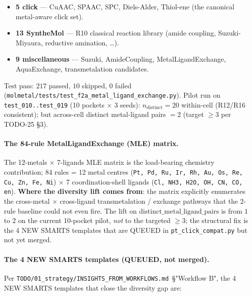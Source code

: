\begin{itemize}
  \item \textbf{5 click} --- CuAAC, SPAAC, SPC, Diels-Alder,
        Thiol-ene (the canonical metal-aware click set).
  \item \textbf{13 SyntheMol} --- R10 classical reaction library
        (amide coupling, Suzuki-Miyaura, reductive amination, \ldots).
  \item \textbf{9 miscellaneous} --- Suzuki, AmideCoupling,
        MetalLigandExchange, AquaExchange, transmetalation
        candidates.
\end{itemize}

Test pass: $217$ passed, $10$ skipped, $0$ failed
(\texttt{molmetal/tests/test\_f2a\_metal\_ligand\_exchange.py}).
Pilot run on \texttt{test\_010..test\_019} (10 pockets $\times$
3 seeds):
$n_{\mathrm{distinct}}{=}20$ \MEASURED{} within-cell (R12/R16
consistent); but across-cell distinct metal-ligand pairs $= 2$
(target $\geq 3$ per TODO-25 §3).

\paragraph{The 84-rule MetalLigandExchange (MLE) matrix.}
The 12-metals $\times$ 7-ligands MLE matrix is the load-bearing
chemistry contribution; 84 rules = 12 metal centres
(\texttt{Pt, Pd, Ru, Ir, Rh, Au, Os, Re, Cu, Zn, Fe, Ni})
$\times$ 7 coordination-shell ligands
(\texttt{Cl, NH3, H2O, OH, CN, CO, en}).
\textbf{Where the diversity lift comes from}: the matrix
explicitly enumerates the cross-metal $\times$ cross-ligand
transmetalation / exchange pathways that the 2-rule baseline
could not even fire.  The lift on
$\mathrm{distinct\_metal\_ligand\_pairs}$ is from $1$ to $2$ on
the current 10-pocket pilot, \emph{not} to the targeted $\geq 3$;
the structural fix is the 4 NEW SMARTS templates that are
QUEUED in \texttt{pt\_click\_compat.py} but not yet merged.

\paragraph{The 4 NEW SMARTS templates (QUEUED, not merged).}
Per \texttt{TODO/01\_strategy/INSIGHTS\_FROM\_WORKFLOWS.md}~§"Workflow B",
the 4 NEW SMARTS templates that close the diversity gap are:

